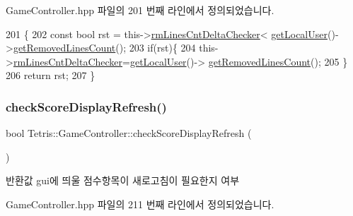 Game\+Controller.\+hpp 파일의 201 번째 라인에서 정의되었습니다.


\begin{DoxyCode}
201                                        \{
202             \textcolor{keyword}{const} \textcolor{keywordtype}{bool} rst = this->\hyperlink{class_tetris_1_1_game_controller_a090fe0dc93a5f3579714346c4ba39bcd}{rmLinesCntDeltaChecker}<
      \hyperlink{class_tetris_1_1_game_controller_abc67d4b309ce2886b43a3b4e0af22abc}{getLocalUser}()->\hyperlink{class_tetris_1_1_users_1_1_game_user_a5912def4d9d77adbb4323b35366724af}{getRemovedLinesCount}();
203             \textcolor{keywordflow}{if}(rst)\{
204                 this->\hyperlink{class_tetris_1_1_game_controller_a090fe0dc93a5f3579714346c4ba39bcd}{rmLinesCntDeltaChecker}=\hyperlink{class_tetris_1_1_game_controller_abc67d4b309ce2886b43a3b4e0af22abc}{getLocalUser}()->
      \hyperlink{class_tetris_1_1_users_1_1_game_user_a5912def4d9d77adbb4323b35366724af}{getRemovedLinesCount}();
205             \}
206             \textcolor{keywordflow}{return} rst;
207         \}
\end{DoxyCode}
\mbox{\label{class_tetris_1_1_game_controller_a626e0107413258a25179813653066776}} 
\subsubsection{\texorpdfstring{check\+Score\+Display\+Refresh()}{checkScoreDisplayRefresh()}}
{\footnotesize\ttfamily bool Tetris\+::\+Game\+Controller\+::check\+Score\+Display\+Refresh (\begin{DoxyParamCaption}{ }\end{DoxyParamCaption})\hspace{0.3cm}{\ttfamily [inline]}}

\begin{DoxyReturn}{반환값}
gui에 띄울 \textquotesingle{}점수\textquotesingle{}항목이 새로고침이 필요한지 여부 
\end{DoxyReturn}


Game\+Controller.\+hpp 파일의 211 번째 라인에서 정의되었습니다.


